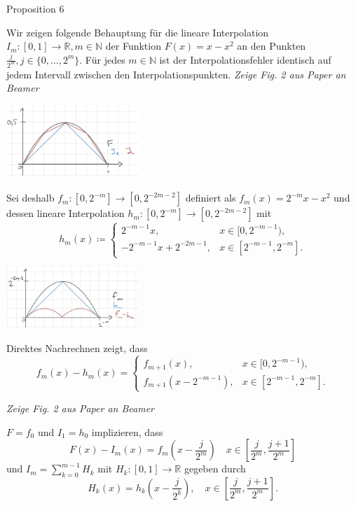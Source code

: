\documentclass[12pt]{article}
\newcommand{\N}{\mathbb{N}} %
\newcommand{\R}{\mathbb{R}} %
\renewcommand{\set}[1]{\{#1\}}
\begin{document}
{\Large Proposition 6} %

Wir zeigen folgende Behauptung für die lineare Interpolation 
\(I_m : [0,1] \rightarrow \R, m\in \N\) der Funktion 
\(F(x) = x - x^2\) an den Punkten \(\frac{j}{2^m}, j \in \set{0,\ldots, 2^m}\).
Für jedes \(m\in\N\) ist der Interpolationsfehler identisch auf jedem Intervall zwischen 
den Interpolationspunkten. \textit{Zeige Fig. 2 aus Paper an Beamer}

\begin{center}
    \includegraphics[width=5cm]{images/iii2_1.jpg} %
\end{center}

Sei deshalb \(f_m: [0,2^{-m}] \rightarrow [0,2^{-2m-2}]\) definiert als \(f_m(x) = 2^{-m}x - x^2\)
und dessen lineare Interpolation \(h_m: [0,2^{-m}] \rightarrow [0,2^{-2m-2}]\) mit 
\[ h_m(x) \coloneqq \begin{cases}
    2^{-m-1}x, &x\in [0,2^{-m-1}), \\
    -2^{-m-1}x + 2^{-2m-1}, &x \in [2^{-m-1}, 2^{-m}].
\end{cases} \]

\begin{center}
    \includegraphics[width=5cm]{images/iii2_2.jpg} %
\end{center}

Direktes Nachrechnen zeigt, dass 
\[ f_m(x) - h_m(x) = \begin{cases}
    f_{m+1}(x), &x\in [0, 2^{-m-1}), \\
    f_{m+1}(x - 2^{-m-1}), &x \in [2^{-m-1}, 2^{-m}].
\end{cases} \]

\textit{Zeige Fig. 2 aus Paper an Beamer}

\(F = f_0\) und \(I_1 = h_0\) implizieren, dass 
\[ F(x) - I_m(x) = f_m(x - \frac{j}{2^m}) \quad x\in [\frac{j}{2^m}, \frac{j+1}{2^m}] \]
und \(I_m = \sum_{k=0}^{m-1} H_k\) mit \(H_k : [0,1]\rightarrow \R\) gegeben durch 
\[ H_k(x) = h_k(x - \frac{j}{2^k}), \quad x\in [\frac{j}{2^m}, \frac{j+1}{2^m}]. \]
\end{document}
